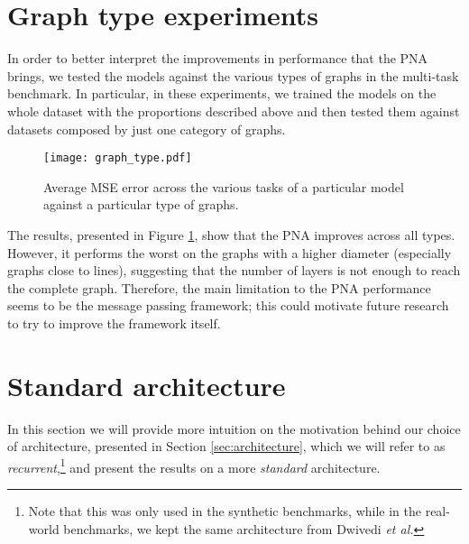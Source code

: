 \documentclass{article}
\begin{document}
\section{Graph type experiments} \label{app:graph_type}

In order to better interpret the improvements in performance that the PNA brings, we tested the models against the various types of graphs in the multi-task benchmark. In particular, in these experiments, we trained the models on the whole dataset with the proportions described above and then tested them against datasets composed by just one category of graphs. 

\begin{figure}[h]
\centering
\texttt{[image: graph\_type.pdf]}
\caption{Average MSE error across the various tasks of a particular model against a particular type of graphs.}
\label{fig:graph_type}
\end{figure}

The results, presented in Figure \ref{fig:graph_type}, show that the PNA improves across all types. However, it performs the worst on the graphs with a higher diameter (especially graphs close to lines), suggesting that the number of layers is not enough to reach the complete graph. Therefore, the main limitation to the PNA performance seems to be the message passing framework; this could motivate future research to try to improve the framework itself.

\section{Standard architecture} \label{app:std_architecture}

In this section we will provide more intuition on the motivation behind our choice of architecture, presented in Section \ref{sec:architecture}, which we will refer to as \textit{recurrent},\footnote{Note that this was only used in the synthetic benchmarks, while in the real-world benchmarks, we kept the same architecture from Dwivedi \textit{et al.}} and present the results on a more \textit{standard} architecture.
\end{document}
